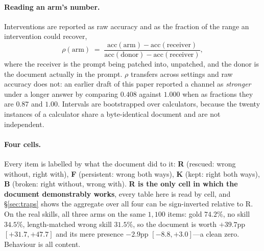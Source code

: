 \documentclass{article}
\begin{document}
\paragraph{Reading an arm's number.} Interventions are reported as raw accuracy
and as the fraction of the range an intervention could recover,
\begin{equation}
\rho(\text{arm}) \;=\;
\frac{\text{acc}(\text{arm}) - \text{acc}(\text{receiver})}
     {\text{acc}(\text{donor}) - \text{acc}(\text{receiver})},
\end{equation}
where the receiver is the prompt being patched into, unpatched, and the donor is
the document actually in the prompt. $\rho$ transfers across settings and raw
accuracy does not: an earlier draft of this paper reported a channel as
\emph{stronger} under a longer answer by comparing $0.408$ against $1.000$ when
as fractions they are $0.87$ and $1.00$. Intervals are bootstrapped over
calculators, because the twenty instances of a calculator share a
byte-identical document and are not independent.

\paragraph{Four cells.}

Every item is labelled by what the document did to it: \textbf{R} (rescued:
wrong without, right with), \textbf{F} (persistent: wrong both ways), \textbf{K}
(kept: right both ways), \textbf{B} (broken: right without, wrong with).
\textbf{R is the only cell in which the document demonstrably works}, every
table here is read by cell, and \S\ref{sec:traps} shows the aggregate over all
four can be sign-inverted relative to R. On the real skills, all three arms on
the same $1{,}100$ items: gold $74.2\%$, no skill $34.5\%$, length-matched wrong
skill $31.5\%$, so the document is worth $+39.7$pp $[+31.7, +47.7]$ and its mere
presence $-2.9$pp $[-8.8, +3.0]$---a clean zero. Behaviour is all content.
\end{document}
